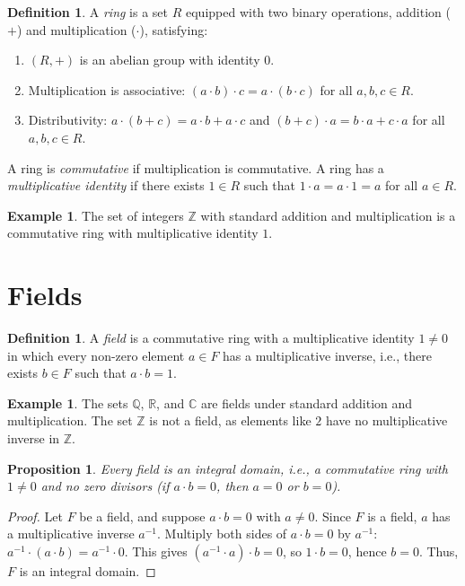 \documentclass[a4paper,11pt]{book}
\theoremstyle{plain}
\newtheorem{proposition}[theorem]{Proposition}
\theoremstyle{definition}
\newtheorem{definition}[theorem]{Definition}
\newtheorem{example}[theorem]{Example}
\newcommand{\Z}{\mathbb{Z}}
\newcommand{\Q}{\mathbb{Q}}
\newcommand{\R}{\mathbb{R}}
\newcommand{\C}{\mathbb{C}}
\begin{document}
\begin{definition}
A \emph{ring} is a set $R$ equipped with two binary operations, addition ($+$) and multiplication ($\cdot$), satisfying:
\begin{enumerate}[label=(\roman*)]
    \item $(R, +)$ is an abelian group with identity $0$.
    \item Multiplication is associative: $(a \cdot b) \cdot c = a \cdot (b \cdot c)$ for all $a, b, c \in R$.
    \item Distributivity: $a \cdot (b + c) = a \cdot b + a \cdot c$ and $(b + c) \cdot a = b \cdot a + c \cdot a$ for all $a, b, c \in R$.
\end{enumerate}
A ring is \emph{commutative} if multiplication is commutative. A ring has a \emph{multiplicative identity} if there exists $1 \in R$ such that $1 \cdot a = a \cdot 1 = a$ for all $a \in R$.
\end{definition}

\begin{example}
The set of integers $\Z$ with standard addition and multiplication is a commutative ring with multiplicative identity $1$.
\end{example}

\section{Fields}

\begin{definition}
A \emph{field} is a commutative ring with a multiplicative identity $1 \neq 0$ in which every non-zero element $a \in F$ has a multiplicative inverse, i.e., there exists $b \in F$ such that $a \cdot b = 1$.
\end{definition}

\begin{example}
The sets $\Q$, $\R$, and $\C$ are fields under standard addition and multiplication. The set $\Z$ is not a field, as elements like $2$ have no multiplicative inverse in $\Z$.
\end{example}

\begin{proposition}
Every field is an integral domain, i.e., a commutative ring with $1 \neq 0$ and no zero divisors (if $a \cdot b = 0$, then $a = 0$ or $b = 0$).
\end{proposition}
\begin{proof}
Let $F$ be a field, and suppose $a \cdot b = 0$ with $a \neq 0$. Since $F$ is a field, $a$ has a multiplicative inverse $a^{-1}$. Multiply both sides of $a \cdot b = 0$ by $a^{-1}$: $a^{-1} \cdot (a \cdot b) = a^{-1} \cdot 0$. This gives $(a^{-1} \cdot a) \cdot b = 0$, so $1 \cdot b = 0$, hence $b = 0$. Thus, $F$ is an integral domain.
\end{proof}
\end{document}
